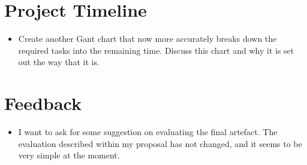 \section{Project Timeline}

\begin{itemize}

    \item 
    Create another Gant chart that now more accurately breaks down the required tasks into the remaining time. Discuss this chart and why it is set out the way that it is. 

\end{itemize}



\section*{Feedback}\label{S:feedback} 


\begin{itemize}
    \item I want to ask for some suggestion on evaluating the final artefact. The evaluation described within my proposal has not changed, and it seems to be very simple at the moment.   
\end{itemize}